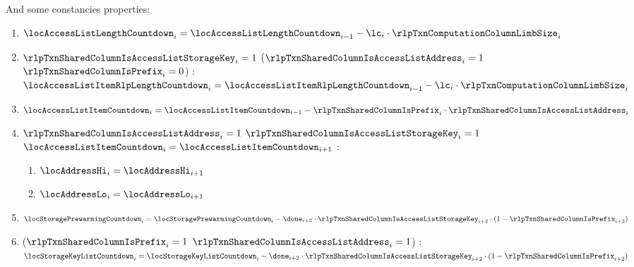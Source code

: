 \begin{enumerate}[resume]
		And some constancies properties:
		\begin{enumerate}
			\item $\locAccessListLengthCountdown _{i} = \locAccessListLengthCountdown _{i - 1} - \lc _{i} \cdot \rlpTxnComputationColumnLimbSize _{i}$
			\item \If $\rlpTxnSharedColumnIsAccessListStorageKey _{i} =1$ \Or ($\rlpTxnSharedColumnIsAccessListAddress _{i} =1$ \et $\rlpTxnSharedColumnIsPrefix _{i} =0$) \Then: $\locAccessListItemRlpLengthCountdown _{i} = \locAccessListItemRlpLengthCountdown _{i - 1} - \lc _{i} \cdot \rlpTxnComputationColumnLimbSize _{i}$
			\item $\locAccessListItemCountdown _{i} = \locAccessListItemCountdown _{i - 1} - \rlpTxnSharedColumnIsPrefix _{i} \cdot \rlpTxnSharedColumnIsAccessListAddress _{i}$
			\item \If $\rlpTxnSharedColumnIsAccessListAddress _{i} =1$ \et $\rlpTxnSharedColumnIsAccessListStorageKey _{i}=1$ \et $\locAccessListItemCountdown _{i} = \locAccessListItemCountdown _{i + 1}$ \Then:
				\begin{enumerate}
					\item $\locAddressHi _{i} = \locAddressHi _{i + 1}$
					\item $\locAddressLo _{i} = \locAddressLo _{i + 1}$
				\end{enumerate}
			\item $\locStoragePrewarmingCountdown _{i} = \locStoragePrewarmingCountdown _{i} - \done _{i + 2} \cdot \rlpTxnSharedColumnIsAccessListStorageKey _{i + 2} \cdot (1 - \rlpTxnSharedColumnIsPrefix _{i + 2})$
			\item \If ($\rlpTxnSharedColumnIsPrefix _{i} =1$ \et $\rlpTxnSharedColumnIsAccessListAddress _{i} =1$) \Then: $\locStorageKeyListCountdown _{i} = \locStorageKeyListCountdown _{i} - \done _{i + 2} \cdot \rlpTxnSharedColumnIsAccessListStorageKey _{i + 2} \cdot (1 - \rlpTxnSharedColumnIsPrefix _{i + 2})$
		\end{enumerate}
	\end{enumerate}
